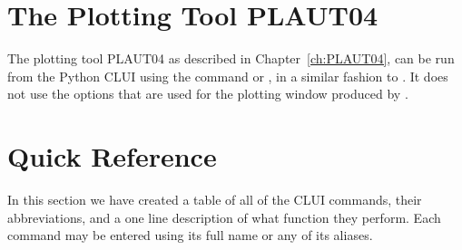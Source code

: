 \documentclass[12pt]{report}
\begin{document}
 \section{ The Plotting Tool PLAUT04}

 The \AUTO plotting tool {\cal PLAUT04} as described
 in Chapter~\ref{ch:PLAUT04}, can be run from the Python CLUI
 using the command
  or , in a similar
 fashion to . It does not use the options that
 are used for the plotting window produced by .

 \section{ Quick Reference } \label{sec:clui quick reference}

 In this section we have created a table of all of the \AUTO CLUI
 commands, their abbreviations, and a one line description of what
 function they perform.  Each command may be entered using 
 its full name or any of its aliases.
\end{document}
